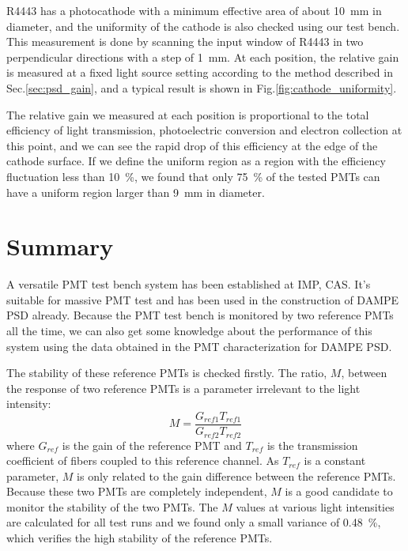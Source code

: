 \documentclass[5p, times]{elsarticle}
\begin{document}
R4443 has a photocathode with a minimum effective area of about \SI{10}{\milli\meter} in diameter, and the uniformity of the cathode is also checked using our test bench.
This measurement is done by scanning the input window of R4443 in two perpendicular directions with a step of \SI{1}{\milli\meter}.
At each position, the relative gain is measured at a fixed light source setting according to the method described in Sec.\ref{sec:psd_gain}, and a typical result is shown in Fig.\ref{fig:cathode_uniformity}.

The relative gain we measured at each position is proportional to the total efficiency of light transmission, photoelectric conversion and electron collection at this point, and we can see the rapid drop of this efficiency at the edge of the cathode surface. 
If we define the uniform region as a region with the efficiency fluctuation less than \SI{10}{\percent}, we found that only \SI{75}{\percent} of the tested PMTs can have a uniform region larger than \SI{9}{\milli\meter} in diameter. 

\section{Summary}
\label{sec:summary}

A versatile PMT test bench system has been established at IMP, CAS. It's suitable for massive PMT test and has been used in the construction of DAMPE PSD already. Because the PMT test bench is monitored by two reference PMTs all the time, we can also get some knowledge about the performance of this system using the data obtained in the PMT characterization for DAMPE PSD.

The stability of these reference PMTs is checked firstly. The ratio, $M$, between the response of two reference PMTs is a parameter irrelevant to the light intensity:
\begin{equation}
 M = \frac{G_{ref1} T_{ref1}}{G_{ref2} T_{ref2}}
\end{equation}
where $G_{ref}$ is the gain of the reference PMT and $T_{ref}$ is the transmission coefficient of fibers coupled to this reference channel.
As $T_{ref}$ is a constant parameter, $M$ is only related to the gain difference between the reference PMTs.
Because these two PMTs are completely independent, $M$ is a good candidate to monitor the stability of the two PMTs. 
The $M$ values at various light intensities are calculated for all test runs and we found only a small variance of \SI{0.48}{\percent}, which verifies the high stability of the reference PMTs.
\end{document}
